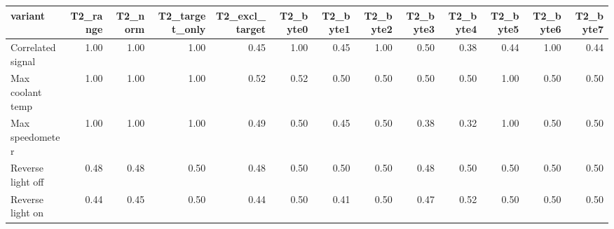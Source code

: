 \begin{tabular}{lrrrrrrrrrrrr}
\toprule
variant & T2_range & T2_norm & T2_target_only & T2_excl_target & T2_byte0 & T2_byte1 & T2_byte2 & T2_byte3 & T2_byte4 & T2_byte5 & T2_byte6 & T2_byte7 \\
\midrule
Correlated signal & 1.00 & 1.00 & 1.00 & 0.45 & 1.00 & 0.45 & 1.00 & 0.50 & 0.38 & 0.44 & 1.00 & 0.44 \\
Max coolant temp & 1.00 & 1.00 & 1.00 & 0.52 & 0.52 & 0.50 & 0.50 & 0.50 & 0.50 & 1.00 & 0.50 & 0.50 \\
Max speedometer & 1.00 & 1.00 & 1.00 & 0.49 & 0.50 & 0.45 & 0.50 & 0.38 & 0.32 & 1.00 & 0.50 & 0.50 \\
Reverse light off & 0.48 & 0.48 & 0.50 & 0.48 & 0.50 & 0.50 & 0.50 & 0.48 & 0.50 & 0.50 & 0.50 & 0.50 \\
Reverse light on & 0.44 & 0.45 & 0.50 & 0.44 & 0.50 & 0.41 & 0.50 & 0.47 & 0.52 & 0.50 & 0.50 & 0.50 \\
\bottomrule
\end{tabular}
